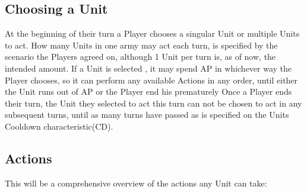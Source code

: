 \documentclass[a4paper,12pt]{book}
\begin{document}
\subsection{Choosing a Unit}
At the beginning of their turn a Player chooses a singular Unit or multiple Units to act. How many Units in one army may act each turn, is specified by the scenario the Players agreed on, although 1 Unit per turn is, as of now, the intended amount. If a Unit is selected , it may spend AP in whichever way the Player chooses, so it can perform any available Actions in any order, until either the Unit runs out of AP or the Player end his prematurely Once a Player ends their turn, the Unit they selected to act this turn can not be chosen to act in any subsequent turns, until as many turns have passed as is specified on the Units Cooldown characteristic(CD).\\

\subsection{Actions}

This will be a comprehensive overview of the actions any Unit can take:
\end{document}
